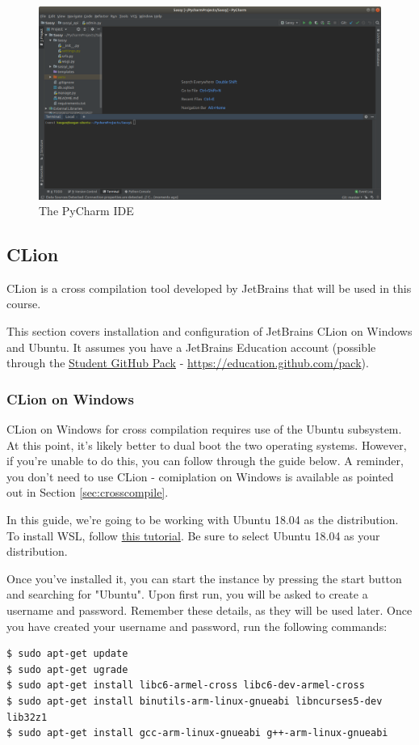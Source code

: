 \begin{figure}[H]
\centering
\includegraphics[width=0.8\columnwidth]{Figures/Pycharm}
\caption{The PyCharm IDE}
\label{fig:Pycharm}
\end{figure}


\subsection{CLion}
\label{sec:CLion}
CLion is a cross compilation tool developed by JetBrains that will be used in this course. 

This section covers installation and configuration of JetBrains CLion on Windows and Ubuntu. It assumes you have a JetBrains Education account (possible through the \href{https://education.github.com/pack}{Student GitHub Pack} - \href{https://education.github.com/pack}{https://education.github.com/pack}).

\subsubsection{CLion on Windows}
CLion on Windows for cross compilation requires use of the Ubuntu subsystem. At this point, it's likely better to dual boot the two operating systems. However, if you're unable to do this, you can follow through the guide below. A reminder, you don't need to use CLion - comiplation on Windows is available as pointed out in Section \ref{sec:crosscompile}.

In this guide, we're going to be working with Ubuntu 18.04 as the distribution. To install WSL, follow \href{https://docs.microsoft.com/en-us/windows/wsl/install-win10}{this tutorial}. Be sure to select Ubuntu 18.04 as your distribution.

Once you've installed it, you can start the instance by pressing the start button and searching for "Ubuntu". Upon first run, you will be asked to create a username and password. Remember these details, as they will be used later. Once you have created your username and password, run the following commands:
\begin{lstlisting}
$ sudo apt-get update 
$ sudo apt-get ugrade
$ sudo apt-get install libc6-armel-cross libc6-dev-armel-cross 
$ sudo apt-get install binutils-arm-linux-gnueabi libncurses5-dev lib32z1
$ sudo apt-get install gcc-arm-linux-gnueabi g++-arm-linux-gnueabi
\end{lstlisting}

